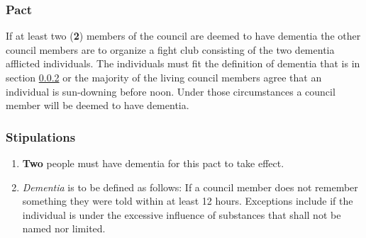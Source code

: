 \documentclass[]{article}
\begin{document}
\subsubsection{Pact}
\label{subsubsec:pacts:dementia:pac}
If at least two (\textbf{2}) members of the council are deemed to have dementia the other council members are to organize a fight club consisting of the two dementia afflicted individuals.
The individuals must fit the definition of dementia that is in section \ref{subsubsec:pacts:dementia:stips} or the majority of the living council members agree that an individual is sun-downing before noon. Under those circumstances a council member will be deemed to have dementia.

\subsubsection{Stipulations}
\label{subsubsec:pacts:dementia:stips}
\begin{enumerate}
	\item \textbf{Two} people must have dementia for this pact to take effect. 

	\item \noindent \textit{Dementia} is to be defined as follows: If a council member does not remember something they were told within at least 12 hours.
	Exceptions include if the individual is under the excessive influence of substances that shall not be named nor limited.
\end{enumerate}
\end{document}
